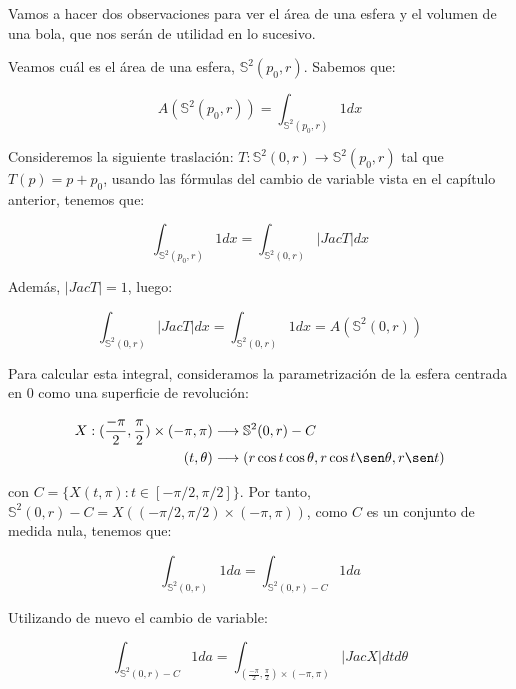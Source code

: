 Vamos a hacer dos observaciones para ver el área de una esfera y el volumen de una bola, que nos serán de utilidad en lo sucesivo.
\begin{remark}
Veamos cuál es el área de una esfera, $\mathbb{S}^2(p_0, r)$. Sabemos que:

\begin{equation*}
    A(\mathbb{S}^2(p_0, r)) = \int_{\mathbb{S}^2(p_0, r)} 1dx
\end{equation*}

Consideremos la siguiente traslación: $T: \mathbb{S}^2(0, r) \longrightarrow \mathbb{S}^2(p_0, r)$ tal que $T(p) = p + p_0$, usando las fórmulas del cambio de variable vista en el capítulo anterior, tenemos que:

\begin{equation*}
    \int_{\mathbb{S}^2(p_0, r)} 1dx = \int_{\mathbb{S}^2(0, r)} |Jac T|dx
\end{equation*}

Además, $|JacT|=1$, luego:

\begin{equation*}
    \int_{\mathbb{S}^2(0, r)} |Jac T|dx = \int_{\mathbb{S}^2(0, r)} 1dx = A(\mathbb{S}^2(0, r))
\end{equation*}

Para calcular esta integral, consideramos la parametrización de la esfera centrada en 0 como una superficie de revolución:

\begin{align*}
    X: (\frac{-\pi}{2}, \frac{\pi}{2}) \times (-\pi, \pi) &\longrightarrow \mathbb{S}^2(0, r) - C \\
    (t, \theta) &\longrightarrow (r\cos t\cos\theta, r\cos t\sen\theta, r\sen t)
\end{align*}

con $C = \{X(t,\pi): t\in [-\pi/2, \pi/2]\}$. Por tanto, $\mathbb{S}^2(0, r) - C = X((-\pi/2, \pi/2) \times (-\pi, \pi))$, como $C$ es un conjunto de medida nula, tenemos que:

\begin{equation*}
    \int_{\mathbb{S}^2(0, r)} 1da = \int_{\mathbb{S}^2(0, r) - C} 1da
\end{equation*}

Utilizando de nuevo el cambio de variable:

\begin{equation*}
    \int_{\mathbb{S}^2(0, r) - C} 1da = \int_{(\frac{-\pi}{2}, \frac{\pi}{2}) \times (-\pi, \pi)} |JacX| dtd\theta
\end{equation*}


\end{remark}
